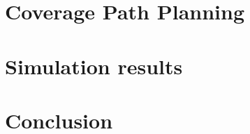 \documentclass[a4paper,12pt, openright, twoside]{report}
\begin{document}
\chapter{Coverage Path Planning} %
\label{cha:coverage_path_planning}


\chapter{Simulation results} %
\label{sec:simulation_results}


\chapter{Conclusion} %
\label{cha:conclusion}



\begin{appendices}









\end{appendices}

\listoffigures
\listoftables
\lstlistoflistings
\printindex

\end{document}
